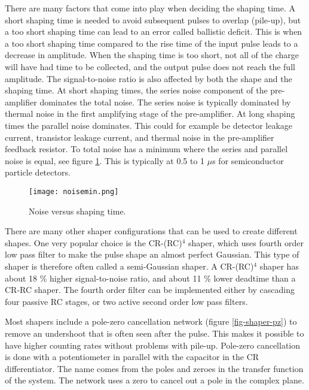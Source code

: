 \documentclass[../main/thesis.tex]{subfiles}
\begin{document}
There are many factors that come into play when deciding the shaping time. A short shaping time is needed to avoid subsequent pulses to overlap (pile-up), but a too short shaping time can lead to an error called ballistic deficit. This is when a too short shaping time compared to the rise time of the input pulse leads to a decrease in amplitude. When the shaping time is too short, not all of the charge will have had time to be collected, and the output pulse does not reach the full amplitude. The signal-to-noise ratio is also affected by both the shape and the shaping time. At short shaping times, the series noise component of the pre-amplifier dominates the total noise. The series noise is typically dominated by thermal noise in the first amplifying stage of the pre-amplifier. At long shaping times the parallel noise dominates. This could for example be detector leakage current, transistor leakage current, and thermal noise in the pre-amplifier feedback resistor. To total noise has a minimum where the series and parallel noise is equal, see figure \ref{fig-noise-min}. This is typically at 0.5 to 1 $\mu$s for semiconductor particle detectors. \citep{ORTEC}
\begin{figure}%
	\centering
	\texttt{[image: noisemin.png]}
	\caption{Noise versus shaping time. \citep{ORTEC} }
	\label{fig-noise-min}
\end{figure}

There are many other shaper configurations that can be used to create different shapes. One very popular choice is the CR-(RC)$^4$ shaper, which uses fourth order low pass filter to make the pulse shape an almost perfect Gaussian. This type of shaper is therefore often called a semi-Gaussian shaper. A CR-(RC)$^4$ shaper has about 18 \% higher signal-to-noise ratio, and about 11 \% lower deadtime than a CR-RC shaper. The fourth order filter can be implemented either by cascading four passive RC stages, or two active second order low pass filters. \citep{ORTEC} \citep[chap. 17]{Knoll}

Most shapers include a pole-zero cancellation network (figure \ref{fig-shaper-pz}) to remove an undershoot that is often seen after the pulse. This makes it possible to have higher counting rates without problems with pile-up. Pole-zero cancellation is done with a potentiometer in parallel with the capacitor in the CR differentiator. The name comes from the poles and zeroes in the transfer function of the system. The network uses a zero to cancel out a pole in the complex plane. \citep{ORTEC}
\end{document}

